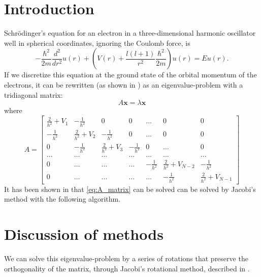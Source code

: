 \documentclass[a4paper]{article}
\begin{document}
\section{Introduction}\label{sec:intro}
Schrödinger's equation for an electron in a three-dimensional harmonic oscillator well in spherical coordinates, ignoring the Coulomb force, is
\begin{equation}
  -\frac{\hbar^2}{2 m} \frac{d^2}{dr^2} u(r)
       + \left ( V(r) + \frac{l (l + 1)}{r^2}\frac{\hbar^2}{2 m}
                                    \right ) u(r)  = E u(r) .
\end{equation}
If we discretize this equation at the ground state of the orbital momentum of the electrons, it can be rewritten (as shown in \cite{fys3150_project2}) as an eigenvalue-problem with a tridiagonal matrix:
\begin{equation*}
A\textbf{x} = \lambda \textbf{x}
\end{equation*}
where
\begin{equation}
A = \begin{bmatrix} \frac{2}{h^2}+V_1 & -\frac{1}{h^2} & 0   & 0    & \dots  &0     & 0 \\
                                -\frac{1}{h^2} & \frac{2}{h^2}+V_2 & -\frac{1}{h^2} & 0    & \dots  &0     &0 \\
                                0   & -\frac{1}{h^2} & \frac{2}{h^2}+V_3 & -\frac{1}{h^2}  &0       &\dots & 0\\
                                \dots  & \dots & \dots & \dots  &\dots      &\dots & \dots\\
                                0   & \dots & \dots & \dots  &-\frac{1}{h^2}  &\frac{2}{h^2}+V_{N-2} & -\frac{1}{h^2}\\
                                0   & \dots & \dots & \dots  &\dots       &-\frac{1}{h^2} & \frac{2}{h^2}+V_{N-1}
             \end{bmatrix}
\label{eq:A_matrix}
\end{equation}
It has been shown in \cite{mhj_lecture_notes} that \eqref{eq:A_matrix} can be solved can be solved by Jacobi's method with the following algorithm.




\section{Discussion of methods}\label{sec:methods}
We can solve this eigenvalue-problem by a series of rotations that preserve the orthogonality of the matrix, through Jacobi's rotational method, described in \cite{mhj_lecture_notes}.
\end{document}
